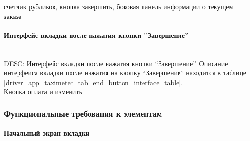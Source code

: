         \label{driver_app_taximeter_tab_start_button_interface_drive_costs}

        \label{driver_app_taximeter_tab_start_button_interface_curr_order_info}
      
        счетчик рубликов, кнопка завершить, боковая панель информации о текущем заказе

      \paragraph{Интерфейс вкладки после нажатия кнопки “Завершение”} \mbox{}\\ \label{driver_app_taximeter_tab_interface_end_button}
        DESC: Интерфейс вкладки после нажатия кнопки “Завершение”. 
        Описание интерфейса вкладки после нажатия на кнопку “Завершение” находится в таблице \ref{driver_app_taximeter_tab_end_button_interface_table}.\\

        Кнопка оплата и изменить

    \subsubsection{Функциональные требования к элементам}
      
      \paragraph{Начальный экран вкладки} \label{taximeter_functional_start_screen} 
        
